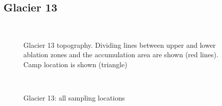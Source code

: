 \documentclass{sfuthesis}
\begin{document}
\begin{appendices}
\section*{Glacier 13}
	\begin{figure}[H]
	\centering
	\\
\caption[]{Glacier 13 topography. Dividing lines between upper and lower ablation zones and the accumulation area are shown (red lines). Camp location is shown (triangle) }
\end{figure}
	\begin{figure}[H]
	\centering
	\\
\caption[]{Glacier 13: all sampling locations}
\end{figure}

\end{appendices}
\end{document}
